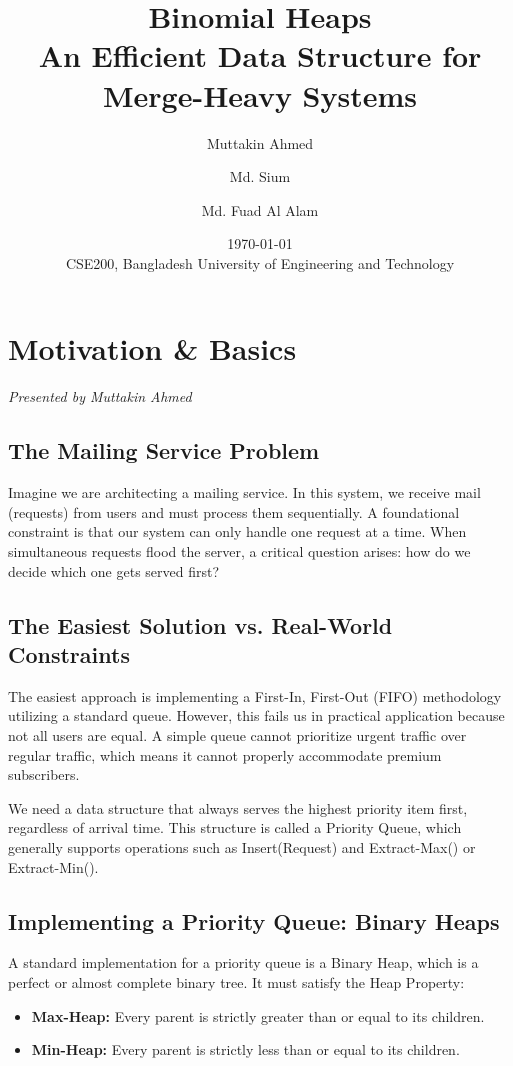 \documentclass[11pt, a4paper]{report}
\title{Binomial Heaps\\ \large An Efficient Data Structure for Merge-Heavy Systems}
\author{Muttakin Ahmed \and Md. Sium \and Md. Fuad Al Alam}
\date{\today \\ \vspace{0.5cm} \small CSE200, Bangladesh University of Engineering and Technology}
\begin{document}
\maketitle
\tableofcontents

\chapter{Motivation \& Basics}
\textit{Presented by Muttakin Ahmed}

\section{The Mailing Service Problem}
Imagine we are architecting a mailing service. In this system, we receive mail (requests) from users and must process them sequentially. A foundational constraint is that our system can only handle one request at a time. When simultaneous requests flood the server, a critical question arises: how do we decide which one gets served first?

\section{The Easiest Solution vs. Real-World Constraints}
The easiest approach is implementing a First-In, First-Out (FIFO) methodology utilizing a standard queue. However, this fails us in practical application because not all users are equal. A simple queue cannot prioritize urgent traffic over regular traffic, which means it cannot properly accommodate premium subscribers. 

We need a data structure that always serves the highest priority item first, regardless of arrival time. This structure is called a Priority Queue, which generally supports operations such as Insert(Request) and Extract-Max() or Extract-Min().

\section{Implementing a Priority Queue: Binary Heaps}
A standard implementation for a priority queue is a Binary Heap, which is a perfect or almost complete binary tree. It must satisfy the Heap Property:
\begin{itemize}
    \item \textbf{Max-Heap:} Every parent is strictly greater than or equal to its children.
    \item \textbf{Min-Heap:} Every parent is strictly less than or equal to its children.
\end{itemize}
\end{document}
